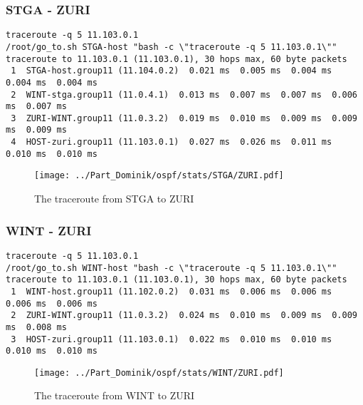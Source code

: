 \subsubsection{STGA - ZURI}
\begin{lstlisting}
traceroute -q 5 11.103.0.1
/root/go_to.sh STGA-host "bash -c \"traceroute -q 5 11.103.0.1\""
traceroute to 11.103.0.1 (11.103.0.1), 30 hops max, 60 byte packets
 1  STGA-host.group11 (11.104.0.2)  0.021 ms  0.005 ms  0.004 ms  0.004 ms  0.004 ms
 2  WINT-stga.group11 (11.0.4.1)  0.013 ms  0.007 ms  0.007 ms  0.006 ms  0.007 ms
 3  ZURI-WINT.group11 (11.0.3.2)  0.019 ms  0.010 ms  0.009 ms  0.009 ms  0.009 ms
 4  HOST-zuri.group11 (11.103.0.1)  0.027 ms  0.026 ms  0.011 ms  0.010 ms  0.010 ms
\end{lstlisting}
\begin{figure}[H]
\centering
\texttt{[image: ../Part\_Dominik/ospf/stats/STGA/ZURI.pdf]}
\caption{The traceroute from STGA to ZURI}
\end{figure}
\clearpage
\subsubsection{WINT - ZURI}
\begin{lstlisting}
traceroute -q 5 11.103.0.1
/root/go_to.sh WINT-host "bash -c \"traceroute -q 5 11.103.0.1\""
traceroute to 11.103.0.1 (11.103.0.1), 30 hops max, 60 byte packets
 1  WINT-host.group11 (11.102.0.2)  0.031 ms  0.006 ms  0.006 ms  0.006 ms  0.006 ms
 2  ZURI-WINT.group11 (11.0.3.2)  0.024 ms  0.010 ms  0.009 ms  0.009 ms  0.008 ms
 3  HOST-zuri.group11 (11.103.0.1)  0.022 ms  0.010 ms  0.010 ms  0.010 ms  0.010 ms
\end{lstlisting}
\begin{figure}[H]
\centering
\texttt{[image: ../Part\_Dominik/ospf/stats/WINT/ZURI.pdf]}
\caption{The traceroute from WINT to ZURI}
\end{figure}
